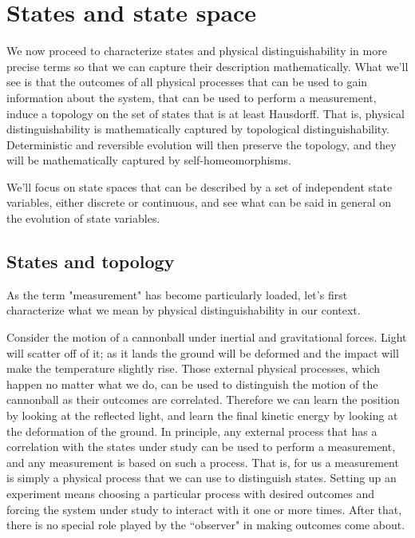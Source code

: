 \documentclass[smallextended]{svjour3}
\numberwithin{equation}{section}
\theoremstyle{definition}
\begin{document}
\section{States and state space}
\label{sec:dynamical_systems}



We now proceed to characterize states and physical distinguishability in more precise terms so that we can capture their description mathematically. What we'll see is that the outcomes of all physical processes that can be used to gain information about the system, that can be used to perform a measurement, induce a topology on the set of states that is at least Hausdorff. That is, physical distinguishability is mathematically captured by topological distinguishability. Deterministic and reversible evolution will then preserve the topology, and they will be mathematically captured by self-homeomorphisms.

We'll focus on state spaces that can be described by a set of independent state variables, either discrete or continuous, and see what can be said in general on the evolution of state variables.

\subsection{States and topology}

As the term "measurement" has become particularly loaded, let's first characterize what we mean by physical distinguishability in our context.

Consider the motion of a cannonball under inertial and gravitational forces. Light will scatter off of it; as it lands the ground will be deformed and the impact will make the temperature slightly rise. Those external physical processes, which happen no matter what we do, can be used to distinguish the motion of the cannonball as their outcomes are correlated. Therefore we can learn the position by looking at the reflected light, and learn the final kinetic energy by looking at the deformation of the ground. In principle, any external process that has a correlation with the states under study can be used to perform a measurement, and any measurement is based on such a process. That is, for us a measurement is simply a physical process that we can use to distinguish states. Setting up an experiment means choosing a particular process with desired outcomes and forcing the system under study to interact with it one or more times. After that, there is no special role played by the ``observer" in making outcomes come about.
\end{document}

